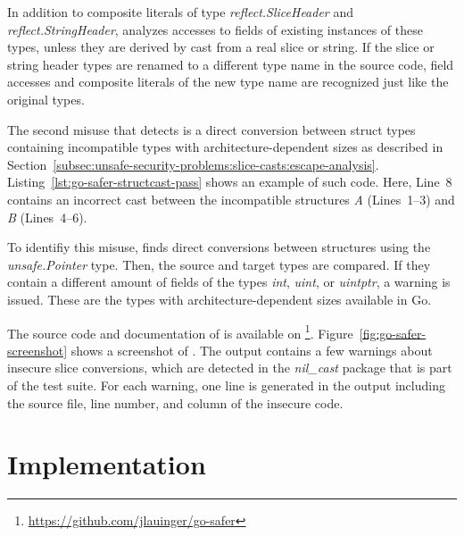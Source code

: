 

In addition to composite literals of type \textit{reflect.SliceHeader} and \textit{reflect.StringHeader}, \toolSafer{}
analyzes accesses to fields of existing instances of these types, unless they are derived by cast from a real slice or
string.
If the slice or string header types are renamed to a different type name in the source code, field accesses and
composite literals of the new type name are recognized just like the original types.

The second misuse that \toolSafer{} detects is a direct conversion between struct types containing incompatible types
with architecture-dependent sizes as described in
Section~\ref{subsec:unsafe-security-problems:slice-casts:escape-analysis}.
Listing~\ref{lst:go-safer-structcast-pass} shows an example of such code.
Here, Line~8 contains an incorrect cast between the incompatible structures \textit{A} (Lines~1--3) and \textit{B}
(Lines~4--6).



To identifiy this misuse, \toolSafer{} finds direct conversions between structures using the \textit{unsafe.Pointer}
type.
Then, the source and target types are compared.
If they contain a different amount of fields of the types \textit{int}, \textit{uint}, or \textit{uintptr}, a warning
is issued.
These are the types with architecture-dependent sizes available in Go.

The source code and documentation of \toolSafer{} is available on
\github{}\footnote{\url{https://github.com/jlauinger/go-safer}}.
Figure~\ref{fig:go-safer-screenshot} shows a screenshot of \toolSafer{}.
The output contains a few warnings about insecure slice conversions, which are detected in the \textit{nil\_cast}
package that is part of the \toolSafer{} test suite.
For each warning, one line is generated in the output including the source file, line number, and column of the insecure
code.





\section{Implementation}\label{sec:go-safer:implementation}

